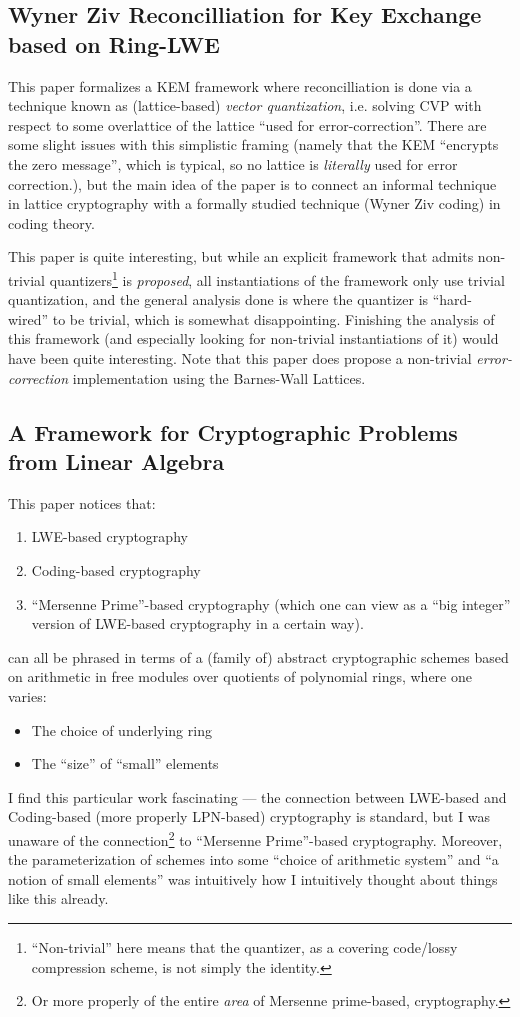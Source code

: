 \documentclass{article}
\begin{document}
	\subsection{Wyner Ziv Reconcilliation for Key Exchange based on Ring-LWE \cite{saliba_wyner-ziv_nodate}}
	This paper formalizes a KEM framework where reconcilliation is done via a technique known as (lattice-based) \emph{vector quantization}, i.e. solving CVP with respect to some overlattice of the lattice ``used for error-correction''.
	There are some slight issues with this simplistic framing (namely that the KEM ``encrypts the zero message'', which is typical, so no lattice is \emph{literally} used for error correction.), but the main idea of the paper is to connect an informal technique in lattice cryptography with a formally studied technique (Wyner Ziv coding) in coding theory.
	
	This paper is quite interesting, but while an explicit framework that admits non-trivial quantizers\footnote{``Non-trivial'' here means that the quantizer, as a covering code/lossy compression scheme, is not simply the identity.} is \emph{proposed}, all instantiations of the framework only use trivial quantization, and the general analysis done is where the quantizer is ``hard-wired'' to be trivial, which is somewhat disappointing.
	Finishing the analysis of this framework (and especially looking for non-trivial instantiations of it) would have been quite interesting.
	Note that this paper does propose a non-trivial \emph{error-correction} implementation using the Barnes-Wall Lattices.
	
	\subsection{A Framework for Cryptographic Problems from Linear Algebra\cite{bootland_framework_2020}}
	
	This paper notices that:
	\begin{enumerate}
		\item LWE-based cryptography
		\item Coding-based cryptography
		\item ``Mersenne Prime''-based cryptography (which one can view as a ``big integer'' version of LWE-based cryptography in a certain way).
	\end{enumerate}
	can all be phrased in terms of a (family of) abstract cryptographic schemes based on arithmetic in free modules over quotients of polynomial rings, where one varies:
	\begin{itemize}
		\item The choice of underlying ring
		\item The ``size'' of ``small'' elements
	\end{itemize}
	I find this particular work fascinating --- the connection between LWE-based and Coding-based (more properly LPN-based) cryptography is standard, but I was unaware of the connection\footnote{Or more properly of the entire \emph{area} of Mersenne prime-based, cryptography.} to ``Mersenne Prime''-based cryptography.
	Moreover, the parameterization of schemes into some ``choice of arithmetic system'' and ``a notion of small elements'' was intuitively how I intuitively thought about things like this already.
	
\end{document}
